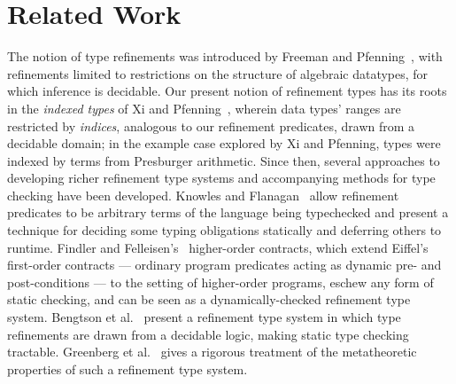 \newcommand\etal{et al.}
\section{Related Work}\label{sec:related}

%
The notion of type refinements was introduced by Freeman and
Pfenning~\cite{FreemanPfenning91}, with refinements limited to
restrictions on the structure of algebraic datatypes, for which
inference is decidable.
%
Our present notion of refinement types has its roots in the
\emph{indexed types} of Xi and Pfenning~\cite{pfenningxi98}, wherein
data types' ranges are restricted by \emph{indices}, analogous to our
refinement predicates, drawn from a decidable domain; in the example
case explored by Xi and Pfenning, types were indexed by terms from
Presburger arithmetic.
%
Since then, several approaches to developing richer refinement type
systems and accompanying methods for type checking have been
developed.
%
Knowles and Flanagan~\cite{Knowles10} allow refinement predicates to
be arbitrary terms of the language being typechecked and present a
technique for deciding some typing obligations statically and
deferring others to runtime.
%
Findler and Felleisen's~\cite{Findler02} higher-order contracts, which
extend Eiffel's~\cite{MeyerBook} first-order contracts --- ordinary
program predicates acting as dynamic pre- and post-conditions --- to
the setting of higher-order programs, eschew any form of static
checking, and can be seen as a dynamically-checked refinement type
system.
%
Bengtson \etal~\cite{GordonTOPLAS2011} present a refinement type
system in which type refinements are drawn from a decidable logic,
making static type checking tractable.
%
Greenberg \etal~\cite{Greenberg11} gives a rigorous treatment of the
metatheoretic properties of such a refinement type system.

